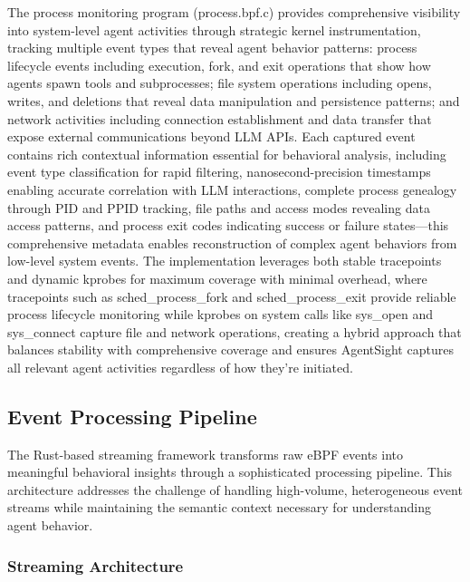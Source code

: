 The process monitoring program (process.bpf.c) provides comprehensive visibility into system-level agent activities through strategic kernel instrumentation, tracking multiple event types that reveal agent behavior patterns: process lifecycle events including execution, fork, and exit operations that show how agents spawn tools and subprocesses; file system operations including opens, writes, and deletions that reveal data manipulation and persistence patterns; and network activities including connection establishment and data transfer that expose external communications beyond LLM APIs. Each captured event contains rich contextual information essential for behavioral analysis, including event type classification for rapid filtering, nanosecond-precision timestamps enabling accurate correlation with LLM interactions, complete process genealogy through PID and PPID tracking, file paths and access modes revealing data access patterns, and process exit codes indicating success or failure states—this comprehensive metadata enables reconstruction of complex agent behaviors from low-level system events. The implementation leverages both stable tracepoints and dynamic kprobes for maximum coverage with minimal overhead, where tracepoints such as sched\_process\_fork and sched\_process\_exit provide reliable process lifecycle monitoring while kprobes on system calls like sys\_open and sys\_connect capture file and network operations, creating a hybrid approach that balances stability with comprehensive coverage and ensures AgentSight captures all relevant agent activities regardless of how they're initiated.

\subsection{Event Processing Pipeline}

The Rust-based streaming framework transforms raw eBPF events into meaningful behavioral insights through a sophisticated processing pipeline. This architecture addresses the challenge of handling high-volume, heterogeneous event streams while maintaining the semantic context necessary for understanding agent behavior.

\subsubsection{Streaming Architecture}

